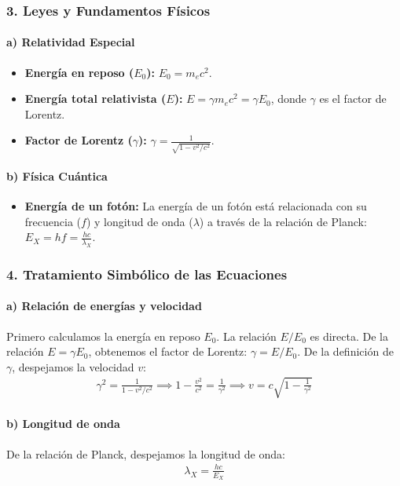 \subsubsection*{3. Leyes y Fundamentos Físicos}
\paragraph*{a) Relatividad Especial}
\begin{itemize}
    \item \textbf{Energía en reposo ($E_0$):} $E_0 = m_e c^2$.
    \item \textbf{Energía total relativista ($E$):} $E = \gamma m_e c^2 = \gamma E_0$, donde $\gamma$ es el factor de Lorentz.
    \item \textbf{Factor de Lorentz ($\gamma$):} $\gamma = \frac{1}{\sqrt{1 - v^2/c^2}}$.
\end{itemize}
\paragraph*{b) Física Cuántica}
\begin{itemize}
    \item \textbf{Energía de un fotón:} La energía de un fotón está relacionada con su frecuencia ($f$) y longitud de onda ($\lambda$) a través de la relación de Planck: $E_X = hf = \frac{hc}{\lambda_X}$.
\end{itemize}

\subsubsection*{4. Tratamiento Simbólico de las Ecuaciones}
\paragraph*{a) Relación de energías y velocidad}
Primero calculamos la energía en reposo $E_0$. La relación $E/E_0$ es directa.
De la relación $E = \gamma E_0$, obtenemos el factor de Lorentz: $\gamma = E/E_0$.
De la definición de $\gamma$, despejamos la velocidad $v$:
\begin{gather}
    \gamma^2 = \frac{1}{1-v^2/c^2} \implies 1-\frac{v^2}{c^2} = \frac{1}{\gamma^2} \implies v = c\sqrt{1 - \frac{1}{\gamma^2}}
\end{gather}
\paragraph*{b) Longitud de onda}
De la relación de Planck, despejamos la longitud de onda:
\begin{gather}
    \lambda_X = \frac{hc}{E_X}
\end{gather}

